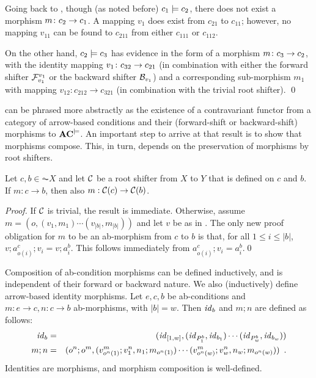 \begin{example}
Going back to , though (as noted before) $c_1\models c_2$, there does not exist a morphism $m\colon c_2\rightarrow c_1$. A mapping $v_1$ does exist from $c_{21}$ to $c_{11}$; however, no mapping $v_{11}$ can be found to $c_{211}$ from either $c_{111}$ or $c_{112}$. 

On the other hand, $c_2\models c_3$ has evidence in the form of a morphism $m\colon c_3\rightarrow c_2$, with the identity mapping $v_1\colon c_{32} \rightarrow c_{21}$ (in combination with either the forward shifter $\mathcal{F}_{v_1}^{v_1}$ or the backward shifter $\mathcal{B}_{v_1}$) and a corresponding sub-morphism $m_1$ with mapping $v_{12}:c_{212}\to c_{321}$ (in combination with the trivial root shifter).
\qed
\end{example}
%
 can be phrased more abstractly as the existence of a contravariant functor from a category of arrow-based conditions and their (forward-shift or backward-shift) morphisms to $\mathbf{AC}^{\models}$. An important step to arrive at that result is to show that morphisms compose. This, in turn, depends on the preservation of morphisms by root shifters.

\begin{lemma}
Let $c,b \in  \AC{X}$ and let $\mathcal{C}$ be a root shifter from $X$ to $Y$ that is defined on $c$ and $b$. If $m:c\to b$, then also $m:\mathcal{C}(c)\rightarrow\mathcal{C}(b)$. 
\end{lemma}
%
\begin{fullorname}
\begin{proof}
If $\mathcal{C}$ is trivial, the result is immediate. Otherwise, assume $m = (o,(v_1,m_1)\cdots(v_{|b|},m_{|b|}))$ and let $v$ be as in . The only new proof obligation for $m$ to be an ab-morphism from $c$ to $b$ is that, for all $1\leq i\leq |b|$, $v;a^c_{o(i)};v_i=v;a^b_i$. This follows immediately from $a^c_{o(i)};v_i=a^b_i$.\qed
\end{proof}
\end{fullorname}
%
Composition of ab-condition morphisms can be defined inductively, and is independent of their forward or backward nature. We also (inductively) define arrow-based identity morphisms. Let $e,c,b$ be ab-conditions and $m:e\to c,n:c\to b$ ab-morphisms, with $|b|=w$. Then $\mathit{id}_b$ and $m;n$ are defined as follows: 
%
\begin{eqnarray}
\id_b & =
  & (\id_{[1,w]},(\id_{P^b_1},\id_{b_1})\cdots 
                 (\id_{P^b_w},\id_{b_w}))
  \eqlabel{id-morphism} \\
m;n & =
  & (o^n;o^m,(v^m_{o^n(1)};v^n_1,n_1;m_{o^n(1)})\cdots 
              (v^m_{o^n(w)};v^n_w,n_w;m_{o^n(w)})) \enspace.
 \eqlabel{morphism composition}
\end{eqnarray}
%
Identities are morphisms, and morphism composition is well-defined.

